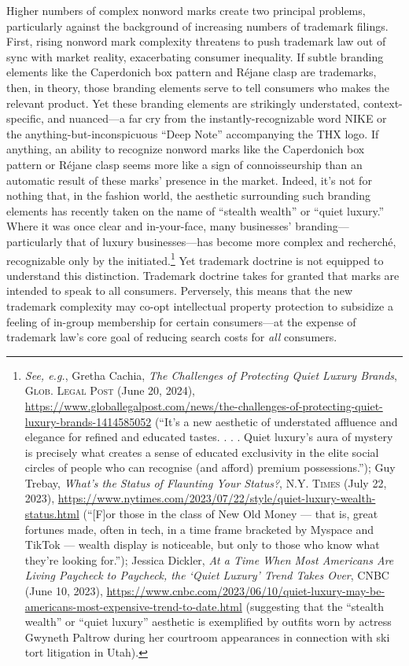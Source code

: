 \documentclass[letterpaper, 11pt, oneside]{article}
\begin{document}
Higher numbers of complex nonword marks create two principal problems, particularly against the background of increasing numbers of trademark filings. First, rising nonword mark complexity threatens to push trademark law out of sync with market reality, exacerbating consumer inequality. If subtle branding elements like the Caperdonich box pattern and Réjane clasp are trademarks, then, in theory, those branding elements serve to tell consumers who makes the relevant product. Yet these branding elements are strikingly understated, context-specific, and nuanced—a far cry from the instantly-recognizable word NIKE or the anything-but-inconspicuous ``Deep Note'' accompanying the THX logo. If anything, an ability to recognize nonword marks like the Caperdonich box pattern or Réjane clasp seems more like a sign of connoisseurship than an automatic result of these marks' presence in the market. Indeed, it's not for nothing that, in the fashion world, the aesthetic surrounding such branding elements has recently taken on the name of ``stealth wealth'' or ``quiet luxury.'' Where it was once clear and in-your-face, many businesses' branding—particularly that of luxury businesses—has become more complex and recherché, recognizable only by the initiated.\footnote{\textit{See, e.g.}, Gretha Cachia, \textit{The Challenges of Protecting Quiet Luxury Brands}, \textsc{Glob. Legal Post} (June 20, 2024), \url{https://www.globallegalpost.com/news/the-challenges-of-protecting-quiet-luxury-brands-1414585052} (``It’s a new aesthetic of understated affluence and elegance for refined and educated tastes. . . . Quiet luxury’s aura of mystery is precisely what creates a sense of educated exclusivity in the elite social circles of people who can recognise (and afford) premium possessions.''); Guy Trebay, \textit{What's the Status of Flaunting Your Status?}, \textsc{N.Y. Times} (July 22, 2023), \url{https://www.nytimes.com/2023/07/22/style/quiet-luxury-wealth-status.html} (``[F]or those in the class of New Old Money — that is, great fortunes made, often in tech, in a time frame bracketed by Myspace and TikTok — wealth display is noticeable, but only to those who know what they’re looking for.''); Jessica Dickler, \textit{At a Time When Most Americans Are Living Paycheck to Paycheck, the ‘Quiet Luxury’ Trend Takes Over}, CNBC (June 10, 2023), \url{https://www.cnbc.com/2023/06/10/quiet-luxury-may-be-americans-most-expensive-trend-to-date.html} (suggesting that the ``stealth wealth'' or ``quiet luxury'' aesthetic is exemplified by outfits worn by actress Gwyneth Paltrow during her courtroom appearances in connection with ski tort litigation in Utah).} Yet trademark doctrine is not equipped to understand this distinction. Trademark doctrine takes for granted that marks are intended to speak to all consumers. Perversely, this means that the new trademark complexity may co-opt intellectual property protection to subsidize a feeling of in-group membership for certain consumers—at the expense of trademark law's core goal of reducing search costs for \textit{all} consumers.
\end{document}
